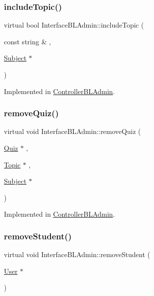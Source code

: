 \subsubsection{\texorpdfstring{include\+Topic()}{includeTopic()}}
{\footnotesize\ttfamily virtual bool Interface\+B\+L\+Admin\+::include\+Topic (\begin{DoxyParamCaption}\item[{const string \&}]{,  }\item[{\hyperlink{class_subject}{Subject} $\ast$}]{ }\end{DoxyParamCaption})\hspace{0.3cm}{\ttfamily [pure virtual]}}



Implemented in \hyperlink{class_controller_b_l_admin_abec5332aa0ecec899ea7ea814c2b2f5e}{Controller\+B\+L\+Admin}.

\mbox{\label{class_interface_b_l_admin_a5e0da435e49e43b169b13725df5a354a}} 
\subsubsection{\texorpdfstring{remove\+Quiz()}{removeQuiz()}}
{\footnotesize\ttfamily virtual void Interface\+B\+L\+Admin\+::remove\+Quiz (\begin{DoxyParamCaption}\item[{\hyperlink{class_quiz}{Quiz} $\ast$}]{,  }\item[{\hyperlink{class_topic}{Topic} $\ast$}]{,  }\item[{\hyperlink{class_subject}{Subject} $\ast$}]{ }\end{DoxyParamCaption})\hspace{0.3cm}{\ttfamily [pure virtual]}}



Implemented in \hyperlink{class_controller_b_l_admin_ad5536394e16e953f2a68e04be748dbd3}{Controller\+B\+L\+Admin}.

\mbox{\label{class_interface_b_l_admin_ac1e32eeb8d7a76c933024fc639fff67f}} 
\subsubsection{\texorpdfstring{remove\+Student()}{removeStudent()}}
{\footnotesize\ttfamily virtual void Interface\+B\+L\+Admin\+::remove\+Student (\begin{DoxyParamCaption}\item[{\hyperlink{class_user}{User} $\ast$}]{ }\end{DoxyParamCaption})\hspace{0.3cm}{\ttfamily [pure virtual]}}



